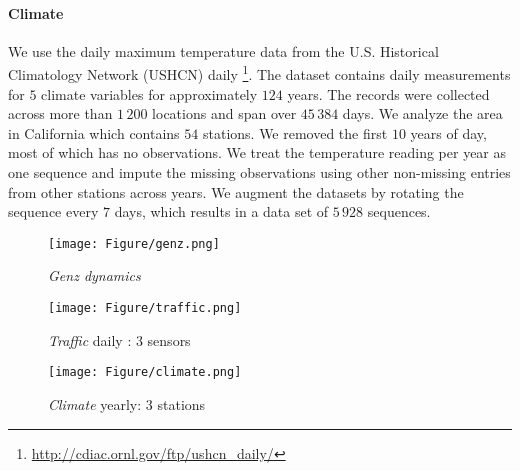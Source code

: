 \paragraph{Climate}
%
We use the daily maximum temperature data from the U.S. Historical Climatology Network (USHCN) daily  \footnote{\url{http://cdiac.ornl.gov/ftp/ushcn\_daily/}}. The dataset contains daily measurements for $5$ climate variables for approximately  $124$ years. The records were collected across more than $1\,200$ locations and span over $45\,384$ days. We analyze the area in California which contains $54$ stations. We removed the first $10$ years of day, most of which has no observations. We treat the temperature reading per year as one sequence and impute the missing observations using other non-missing entries from other stations across years. We augment the datasets by rotating the sequence every $7$ days, which results in a data set of $5\,928$ sequences.

%

 \begin{figure*}[t]
 	\vskip 0.2in
 \begin{subfigure}[b]{0.32\linewidth}
 	\centering
 	\texttt{[image: Figure/genz.png]}
 	\caption{\textsl{Genz dynamics}}
 	\label{fig:genz}
 \end{subfigure}
     \begin{subfigure}[b]{0.32\linewidth}
         \centering
         \texttt{[image: Figure/traffic.png]}
         \caption{\textsl{Traffic} daily : 3 sensors  }
                 \label{fig:traffic}
     \end{subfigure}
     \begin{subfigure}[b]{0.32\linewidth}
         \centering
         \texttt{[image: Figure/climate.png]}
         \caption{\textsl{Climate} yearly: 3 stations }
                 \label{fig:climate}
     \end{subfigure}
     \caption{Data visualizations:
     (\ref{fig:genz}) Genz dynamics,
     (\ref{fig:traffic}) traffic data,
     (\ref{fig:climate}) climate data.}
     \label{fig:data_visual}
     \vskip -0.2in
 \end{figure*}


